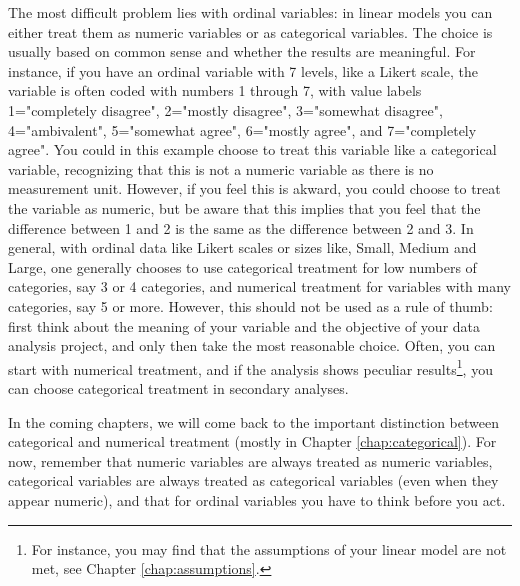 The most difficult problem lies with ordinal variables: in linear models you can either treat them as numeric variables or as categorical variables. The choice is usually based on common sense and whether the results are meaningful. For instance, if you have an ordinal variable with 7 levels, like a Likert scale, the variable is often coded with numbers 1 through 7, with value labels 1="completely disagree", 2="mostly disagree", 3="somewhat disagree", 4="ambivalent", 5="somewhat agree", 6="mostly agree", and 7="completely agree". You could in this example choose to treat this variable like a categorical variable, recognizing that this is not a numeric variable as there is no measurement unit. However, if you feel this is akward, you could choose to treat the variable as numeric, but be aware that this implies that you feel that the difference between 1 and 2 is the same as the difference between 2 and 3. In general, with ordinal data like Likert scales or sizes like, Small, Medium and Large, one generally chooses to use categorical treatment for low numbers of categories, say 3 or 4 categories, and numerical treatment for variables with many categories, say 5 or more. However, this should not be used as a rule of thumb: first think about the meaning of your variable and the objective of your data analysis project, and only then take the most reasonable choice. Often, you can start with numerical treatment, and if the analysis shows peculiar results\footnote{For instance, you may find that the assumptions of your linear model are not met, see Chapter \ref{chap:assumptions}.}, you can choose categorical treatment in secondary analyses.

In the coming chapters, we will come back to the important distinction between categorical and numerical treatment (mostly in Chapter \ref{chap:categorical}). For now, remember that numeric variables are always treated as numeric variables, categorical variables are always treated as categorical variables (even when they appear numeric), and that for ordinal variables you have to think before you act.



